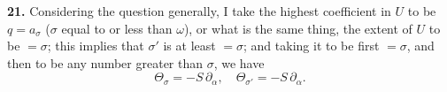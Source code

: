 \documentclass[11pt]{article}
\begin{document}
\textbf{21.} Considering the question generally, I take the highest coefficient in $U$ to be $q = a_\sigma$ ($\sigma$ equal to or less than $\omega$), or what is the same thing, the extent of $U$ to be $= \sigma$; this implies that $\sigma'$ is at least $= \sigma$; and taking it to be first $= \sigma$, and then to be any number greater than $\sigma$, we have
\[
\Theta_\sigma = -S\,\partial_\alpha,\quad \Theta_{\sigma'} = -S\,\partial_\alpha.
\]
\end{document}
